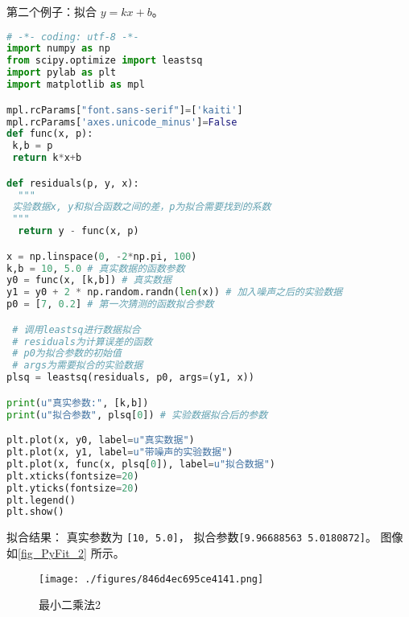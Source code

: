 第二个例子：拟合 $y=kx+b$。
\begin{lstlisting}[language=python]
# -*- coding: utf-8 -*-
import numpy as np
from scipy.optimize import leastsq
import pylab as plt
import matplotlib as mpl

mpl.rcParams["font.sans-serif"]=['kaiti']
mpl.rcParams['axes.unicode_minus']=False
def func(x, p):
 k,b = p
 return k*x+b

def residuals(p, y, x):
  """
 实验数据x, y和拟合函数之间的差，p为拟合需要找到的系数
 """
  return y - func(x, p)

x = np.linspace(0, -2*np.pi, 100)
k,b = 10, 5.0 # 真实数据的函数参数
y0 = func(x, [k,b]) # 真实数据
y1 = y0 + 2 * np.random.randn(len(x)) # 加入噪声之后的实验数据
p0 = [7, 0.2] # 第一次猜测的函数拟合参数

 # 调用leastsq进行数据拟合
 # residuals为计算误差的函数
 # p0为拟合参数的初始值
 # args为需要拟合的实验数据
plsq = leastsq(residuals, p0, args=(y1, x))

print(u"真实参数:", [k,b])
print(u"拟合参数", plsq[0]) # 实验数据拟合后的参数

plt.plot(x, y0, label=u"真实数据")
plt.plot(x, y1, label=u"带噪声的实验数据")
plt.plot(x, func(x, plsq[0]), label=u"拟合数据")
plt.xticks(fontsize=20)
plt.yticks(fontsize=20)
plt.legend()
plt.show()
\end{lstlisting}
拟合结果： 真实参数为 \verb|[10, 5.0]|， 拟合参数\verb|[9.96688563 5.0180872]|。 图像如\autoref{fig_PyFit_2} 所示。
\begin{figure}[ht]
\centering
\texttt{[image: ./figures/846d4ec695ce4141.png]}
\caption{最小二乘法2} \label{fig_PyFit_2}
\end{figure}
